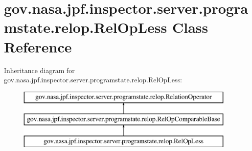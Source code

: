 \hypertarget{classgov_1_1nasa_1_1jpf_1_1inspector_1_1server_1_1programstate_1_1relop_1_1_rel_op_less}{}\section{gov.\+nasa.\+jpf.\+inspector.\+server.\+programstate.\+relop.\+Rel\+Op\+Less Class Reference}
\label{classgov_1_1nasa_1_1jpf_1_1inspector_1_1server_1_1programstate_1_1relop_1_1_rel_op_less}
Inheritance diagram for gov.\+nasa.\+jpf.\+inspector.\+server.\+programstate.\+relop.\+Rel\+Op\+Less\+:\begin{figure}[H]
\begin{center}
\leavevmode
\includegraphics[height=3.000000cm]{classgov_1_1nasa_1_1jpf_1_1inspector_1_1server_1_1programstate_1_1relop_1_1_rel_op_less}
\end{center}
\end{figure}
